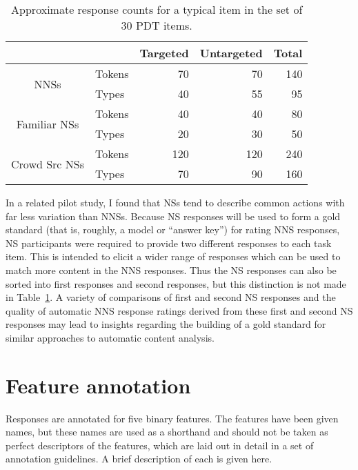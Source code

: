 \documentclass[11pt]{article}
\begin{document}
\bigskip
\begin{table}[h!]
\begin{center}
\begin{tabular}{|c|l|r|r|r|}
	\hline
	&  & Targeted & Untargeted & Total \\
	\hline
	\hline
	\multirow{2}{*}{NNSs} & Tokens & 70 & 70 & 140 \\
	\cline{2-5}
	& Types & 40 & 55 & 95 \\
	\hline
	\hline
	\multirow{2}{*}{Familiar NSs} & Tokens & 40 & 40 & 80 \\
	\cline{2-5}
	& Types & 20 & 30 & 50 \\
	\hline
	\hline
	\multirow{2}{*}{Crowd Src NSs} & Tokens & 120 & 120 & 240 \\
	\cline{2-5}
	& Types & 70 & 90 & 160 \\
	\hline
\end{tabular}
\caption{Approximate response counts for a typical item in the set of 30 PDT items.}
\label{fig:response-counts}
\end{center}
\end{table}
\bigskip

In a related pilot study, I found that NSs tend to describe common actions with far less variation than NNSs. Because NS responses will be used to form a gold standard (that is, roughly, a model or ``answer key'') for rating NNS responses, NS participants were required to provide two different responses to each task item. This is intended to elicit a wider range of responses which can be used to match more content in the NNS responses. Thus the NS responses can also be sorted into first responses and second responses, but this distinction is not made in Table~\ref{fig:response-counts}. A variety of comparisons of first and second NS responses and the quality of automatic NNS response ratings derived from these first and second NS responses may lead to insights regarding the building of a gold standard for similar approaches to automatic content analysis.

\section{Feature annotation}
Responses are annotated for five binary features. The features have been given names, but these names are used as a shorthand and should not be taken as perfect descriptors of the features, which are laid out in detail in a set of annotation guidelines. A brief description of each is given here.
\end{document}
